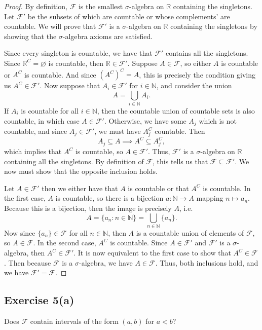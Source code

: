 \documentclass[12pt]{article}
\newenvironment{problem}
    {\begin{lrbox}{\mybox}\begin{minipage}{\textwidth-10pt}}
    {\end{minipage}\end{lrbox}\framebox[\textwidth]{\usebox{\mybox}}}
\newcommand{\N}{\mathbb{N}}
\newcommand{\R}{\mathbb{R}}
\let\emptyset\varnothing
\newcommand{\FF}{\mathcal{F}}
\begin{document}
\begin{proof}
    By definition, $\FF$ is the smallest $\sigma$-algebra on $\R$ containing the singletons. Let $\FF'$ be the subsets of which are countable or whose complements' are countable. We will prove that $\FF'$ is a $\sigma$-algebra on $\R$ containing the singletons by showing that the $\sigma$-algebra axioms are satisfied.
    
    Since every singleton is countable, we have that $\FF'$ contains all the singletons. Since $\R^C = \emptyset$ is countable, then $\R\in\FF'$. Suppose $A\in\FF$, so either $A$ is countable or $A^C$ is countable. And since $(A^C)^C=A$, this is precisely the condition giving us $A^C\in\FF'$. Now suppose that $A_i\in\FF'$ for $i\in\N$, and consider the union
    \[A = \bigcup_{i\in\N}A_i.\]
    If $A_i$ is countable for all $i\in\N$, then the countable union of countable sets is also countable, in which case $A\in\FF'$. Otherwise, we have some $A_j$ which is not countable, and since $A_j\in\FF'$, we must have $A_j^C$ countable. Then
    \[A_j \subseteq A \implies A^C \subseteq A_j^C,\]
    which implies that $A^C$ is countable, so $A\in\FF'$. Thus, $\FF'$ is a $\sigma$-algebra on $\R$ containing all the singletons. By definition of $\FF$, this tells us that $\FF\subseteq\FF'$. We now must show that the opposite inclusion holds.
    
    Let $A\in\FF'$ then we either have that $A$ is countable or that $A^C$ is countable. In the first case, $A$ is countable, so there is a bijection $a:\N\to A$ mapping $n\mapsto a_n$. Because this is a bijection, then the image is precisely $A$, i.e.
    \[A = \{a_n : n\in\N\} = \bigcup_{n\in\N}\{a_n\}.\]
    Now since $\{a_n\}\in\FF$ for all $n\in\N$, then $A$ is a countable union of elements of $\FF$, so $A\in\FF$. In the second case, $A^C$ is countable. Since $A\in\FF'$ and $\FF'$ is a $\sigma$-algebra, then $A^C\in\FF'$. It is now equivalent to the first case to show that $A^C\in\FF$. Then because $\FF$ is a $\sigma$-algebra, we have $A\in\FF$. Thus, both inclusions hold, and we have $\FF' = \FF$.
    
\end{proof}

\subsection*{Exercise 5(a)}
\begin{problem}
    Does $\FF$ contain intervals of the form $(a,b)$ for $a<b$?
\end{problem}
\medskip
\end{document}
